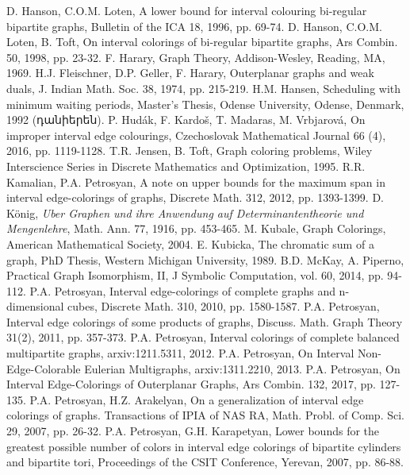  D. Hanson, C.O.M. Loten, A lower bound for interval colouring bi-regular bipartite graphs, Bulletin of the ICA 18, 1996, pp. 69-74.
	D. Hanson, C.O.M. Loten, B. Toft, On interval colorings of bi-regular bipartite graphs, Ars Combin. 50, 1998, pp. 23-32.
 F. Harary, Graph Theory, Addison-Wesley, Reading, MA, 1969. 
 H.J. Fleischner, D.P. Geller, F. Harary, Outerplanar graphs and weak duals, J. Indian Math. Soc. 38, 1974, pp. 215-219.
 H.M. Hansen, Scheduling with minimum waiting periods, Master's Thesis, Odense University, Odense, Denmark, 1992 (դանիերեն).
 P. Hudák, F. Kardoš, T. Madaras, M. Vrbjarová, On improper interval edge colourings, Czechoslovak Mathematical Journal 66 (4), 2016, pp. 1119-1128.
 T.R. Jensen, B. Toft, Graph coloring problems, Wiley Interscience Series in Discrete Mathematics and Optimization, 1995.
	R.R. Kamalian, P.A. Petrosyan, A note on upper bounds for the maximum span in interval edge-colorings of graphs, Discrete Math. 312, 2012, pp. 1393-1399.
 D. König, \textit{Uber Graphen und ihre Anwendung auf Determinantentheorie und Mengenlehre}, Math. Ann. 77, 1916, pp. 453-465.
 M. Kubale, Graph Colorings, American Mathematical Society, 2004.
 E. Kubicka, The chromatic sum of a graph, PhD Thesis, Western Michigan University, 1989.
 B.D. McKay, A. Piperno, Practical Graph Isomorphism, II, J Symbolic Computation, vol. 60, 2014, pp. 94-112. %
	P.A. Petrosyan, Interval edge-colorings of complete graphs and n-dimensional cubes, Discrete Math. 310, 2010, pp. 1580-1587.
	P.A. Petrosyan, Interval edge colorings of some products of graphs, Discuss. Math. Graph Theory 31(2), 2011, pp. 357-373.
	P.A. Petrosyan, Interval colorings of complete balanced multipartite graphs, arxiv:1211.5311, 2012.
	P.A. Petrosyan, On Interval Non-Edge-Colorable Eulerian Multigraphs, arxiv:1311.2210, 2013.
 P.A. Petrosyan, On Interval Edge-Colorings of Outerplanar Graphs, Ars Combin. 132, 2017, pp. 127-135.
 P.A. Petrosyan, H.Z. Arakelyan, On a generalization of interval edge colorings of graphs. Transactions of IPIA of NAS RA, Math. Probl. of Comp. Sci. 29, 2007, pp. 26-32.
 P.A. Petrosyan, G.H. Karapetyan, Lower bounds for the greatest possible number of colors in interval edge colorings of bipartite cylinders and bipartite tori, Proceedings of the CSIT Conference, Yerevan, 2007, pp. 86-88.
